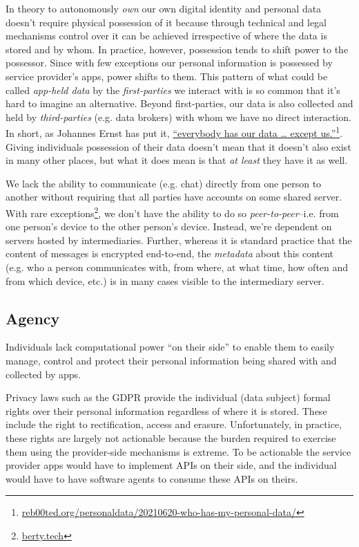 \documentclass[11pt, oneside]{article}   	%
\newcommand{\hyperfootnote}[1][]{\def\ArgI{{#1}}\hyperfootnoteRelay}
\newcommand\hyperfootnoteRelay[2][]{\href{#1#2}{\ArgI}\footnote{\href{#1#2}{#2}}}
\begin{document}
In theory to autonomously \emph{own} our own digital identity and personal data doesn't require physical possession of it because through technical and legal mechanisms control over it can be achieved irrespective of where the data is stored and by whom. In practice, however, possession tends to shift power to the possessor. Since with few exceptions our personal information is possessed by service provider's apps, power shifts to them. This pattern of what could be called \emph{app-held data} by the \emph{first-parties} we interact with is so common that it's hard to imagine an alternative. Beyond first-parties, our data is also collected and held by \emph{third-parties} (e.g. data brokers) with whom we have no direct interaction. In short, as Johannes Ernst has put it, \hyperfootnote[“everybody has our data … except us.”][https://]{reb00ted.org/personaldata/20210620-who-has-my-personal-data/}. Giving individuals possession of their data doesn't mean that it doesn't also exist in many other places, but what it does mean is that \emph{at least} they have it as well.

We lack the ability to communicate (e.g. chat) directly from one person to another without requiring that all parties have accounts on some shared server. With rare exceptions\hyperfootnote[][https://]{berty.tech}, we don't have the ability to do so \emph{peer-to-peer}--i.e. from one person's device to the other person's device. Instead, we're dependent on servers hosted by intermediaries. Further, whereas it is standard practice that the content of messages is encrypted end-to-end, the \emph{metadata} about this content (e.g. who a person communicates with, from where, at what time, how often and from which device, etc.) is in many cases visible to the intermediary server.

\subsection{Agency}

Individuals lack computational power ``on their side'' to enable them to easily manage, control and protect their personal information being shared with and collected by apps.

Privacy laws such as the GDPR provide the individual (data subject) formal rights over their personal information regardless of where it is stored. These include the right to rectification, access and erasure. Unfortunately, in practice, these rights are largely not actionable because the burden required to exercise them using the provider-side mechanisms is extreme. To be actionable the service provider apps would have to implement APIs on their side, and the individual would have to have software agents to consume these APIs on theirs. 
\end{document}
